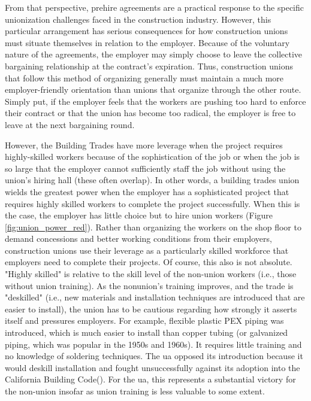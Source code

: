 \documentclass[12pt]{article}
\begin{document}
From that perspective, prehire agreements are a practical response to the specific unionization challenges faced in the construction industry. However, this particular arrangement has serious consequences for how construction unions must situate themselves in relation to the employer. Because of the voluntary nature of the agreements, the employer may simply choose to leave the collective bargaining relationship at the contract's expiration. Thus, construction unions that follow this method of organizing generally must maintain a much more employer-friendly orientation than unions that organize through the other route. Simply put, if the employer feels that the workers are pushing too hard to enforce their contract or that the union has become too radical, the employer is free to leave at the next bargaining round.

However, the Building Trades have more leverage when the project requires highly-skilled workers because of the sophistication of the job or when the job is so large that the employer cannot sufficiently staff the job without using the union's hiring hall (these often overlap). In other words, a building trades union wields the greatest power when the employer has a sophisticated project that requires highly skilled workers to complete the project successfully. When this is the case, the employer has little choice but to hire union workers (Figure \ref{fig:union_power_red}). Rather than organizing the workers on the shop floor to demand concessions and better working conditions from their employers, construction unions use their leverage as a particularly skilled workforce that employers need to complete their projects. Of course, this also is not absolute. "Highly skilled" is relative to the skill level of the non-union workers (i.e., those without union training). As the nonunion's training improves, and the trade is "deskilled" (i.e., new materials and installation techniques are introduced that are easier to install), the union has to be cautious regarding how strongly it asserts itself and pressures employers. For example, flexible plastic PEX piping was introduced, which is much easier to install than copper tubing (or galvanized piping, which was popular in the 1950s and 1960s). It requires little training and no knowledge of soldering techniques. The \acrfull{ua} opposed its introduction because it would deskill installation and fought unsuccessfully against its adoption into the California Building Code(\cite{faloonCaliforniaConsumerGroups2002, CaliforniaCaughtDebate2004}). For the \acrshort{ua}, this represents a substantial victory for the non-union insofar as union training is less valuable to some extent.
\end{document}
